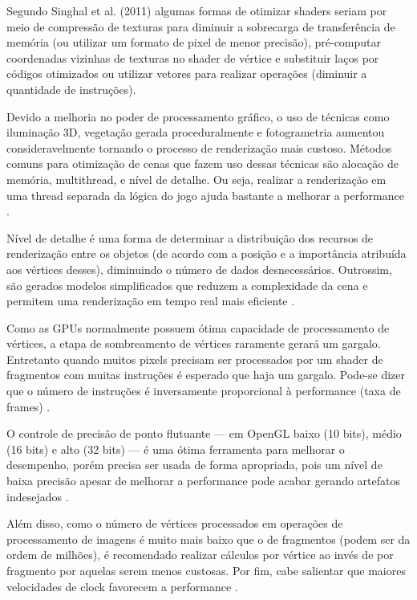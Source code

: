 Segundo Singhal et al. (2011) algumas formas de otimizar shaders seriam por meio de compressão de texturas para diminuir a sobrecarga de transferência de memória (ou utilizar um formato de pixel de menor precisão), pré-computar coordenadas vizinhas de texturas no shader de vértice e substituir laços por códigos otimizados ou utilizar vetores para realizar operações (diminuir a quantidade de instruções).

Devido a melhoria no poder de processamento gráfico, o uso de técnicas como iluminação 3D, vegetação gerada proceduralmente e fotogrametria aumentou consideravelmente tornando o processo de renderização mais custoso. Métodos comuns para otimização de cenas que fazem uso dessas técnicas são alocação de memória, \Gls{multithread}, e nível de detalhe. Ou seja, realizar a renderização em uma thread separada da lógica do jogo ajuda bastante a melhorar a performance \cite{zhang2017vegetation}.

Nível de detalhe é uma forma de determinar a distribuição dos recursos de renderização entre os objetos (de acordo com a posição e a importância atribuída aos vértices desses), diminuindo o número de dados desnecessários. Outrossim, são gerados modelos simplificados que reduzem a complexidade da cena e permitem uma renderização em tempo real mais eficiente \cite{zhang2017vegetation}.

Como as GPUs normalmente possuem ótima capacidade de processamento de vértices, a etapa de sombreamento de vértices raramente gerará um gargalo. Entretanto quando muitos pixels precisam ser processados por um shader de fragmentos com muitas instruções é esperado que haja um gargalo. Pode-se dizer que o número de instruções é inversamente proporcional à performance (taxa de frames) \cite{optimizationMobile}.

O controle de precisão de ponto flutuante --- em OpenGL baixo (10 bits), médio (16 bits) e alto (32 bits) --- é uma ótima ferramenta para melhorar o desempenho, porém precisa ser usada de forma apropriada, pois um nível de baixa precisão apesar de melhorar a performance pode acabar gerando artefatos indesejados \cite{optimizationMobile}.



Além disso, como o número de vértices processados em operações de processamento de imagens é muito mais baixo que o de fragmentos (podem ser da ordem de milhões), é recomendado realizar cálculos por vértice ao invés de por fragmento por aquelas serem menos custosas. Por fim, cabe salientar que maiores velocidades de clock favorecem a performance \cite{optimizationMobile}.

